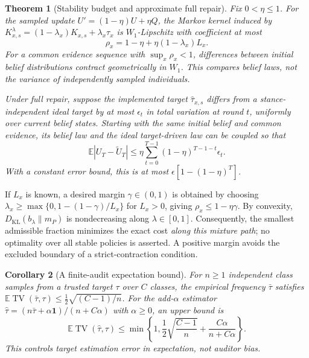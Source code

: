 \documentclass{article}
\newtheorem{theorem}{Theorem}
\newtheorem{corollary}[theorem]{Corollary}
\newcommand{\E}{\mathbb E}
\newcommand{\KL}{D_{\mathrm{KL}}}
\newcommand{\TV}{\operatorname{TV}}
\begin{document}
\begin{theorem}[Stability budget and approximate full repair]
\label{thm:stability}
Fix $0<\eta\le1$. For the sampled update $U'=(1-\eta)U+\eta Q$,
the Markov kernel induced by
$K^\lambda_{x,s}=(1-\lambda_x)K_{x,s}+\lambda_x\tau_x$ is $W_1$-Lipschitz
with coefficient at most
\begin{equation}
 \rho_x=1-\eta+\eta(1-\lambda_x)L_x.
 \label{eq:rho}
\end{equation}
For a common evidence sequence with $\sup_x\rho_x<1$, differences between
initial belief distributions contract geometrically in $W_1$. This compares
belief laws, not the variance of independently sampled individuals.

Under full repair, suppose the implemented target $\widehat\tau_{x,s}$ differs
from a stance-independent ideal target by at most $\epsilon_t$ in total
variation at round $t$, uniformly over current belief states. Starting with the same initial belief and common
evidence, its belief law and the ideal target-driven law can be coupled so that
\begin{equation}
 \E|U_T-\widetilde U_T|
 \le\eta\sum_{t=0}^{T-1}(1-\eta)^{T-1-t}\epsilon_t.
 \label{eq:error}
\end{equation}
With a constant error bound, this is at most
$\epsilon[1-(1-\eta)^T]$.
\end{theorem}

If $L_x$ is known, a desired margin $\gamma\in(0,1)$ is obtained by choosing
$\lambda_x\ge\max\{0,1-(1-\gamma)/L_x\}$ for $L_x>0$, giving
$\rho_x\le1-\eta\gamma$. By convexity, $\KL(b_\lambda\|m_P)$ is
nondecreasing along $\lambda\in[0,1]$. Consequently, the smallest admissible
fraction minimizes the exact cost \emph{along this mixture path}; no
optimality over all stable policies is asserted. A positive margin avoids
the excluded boundary of a strict-contraction condition.

\begin{corollary}[A finite-audit expectation bound]
\label{cor:audit}
For $n\ge1$ independent class samples from a trusted target $\tau$ over $C$ classes,
the empirical frequency $\bar\tau$ satisfies
$\E\TV(\bar\tau,\tau)\le\tfrac12\sqrt{(C-1)/n}$.
For the add-$\alpha$ estimator
$\widehat\tau=(n\bar\tau+\alpha\boldsymbol1)/(n+C\alpha)$ with $\alpha\ge0$,
an upper bound is
\begin{equation}
 \E\TV(\widehat\tau,\tau)
 \le\min\left\{1,\frac12\sqrt{\frac{C-1}{n}}+
                   \frac{C\alpha}{n+C\alpha}\right\}.
 \label{eq:auditsamples}
\end{equation}
This controls target estimation error in expectation, not auditor bias.
\end{corollary}
\end{document}
